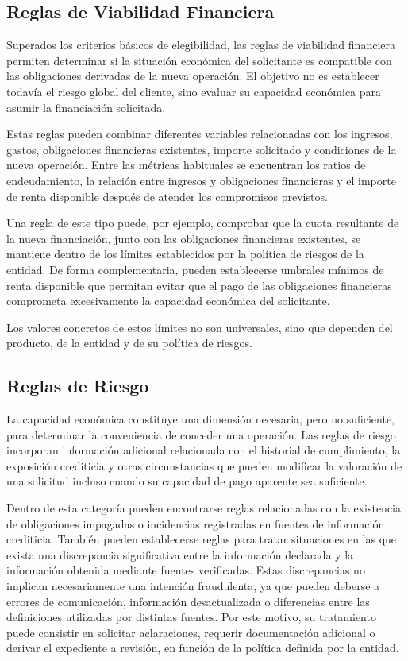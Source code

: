 \documentclass[12pt,a4paper]{report}
\begin{document}
\subsection{Reglas de Viabilidad Financiera}

Superados los criterios básicos de elegibilidad, las reglas de viabilidad financiera permiten determinar si la situación económica del solicitante es compatible con las obligaciones derivadas de la nueva operación. El objetivo no es establecer todavía el riesgo global del cliente, sino evaluar su capacidad económica para asumir la financiación solicitada.

Estas reglas pueden combinar diferentes variables relacionadas con los ingresos, gastos, obligaciones financieras existentes, importe solicitado y condiciones de la nueva operación. Entre las métricas habituales se encuentran los ratios de endeudamiento, la relación entre ingresos y obligaciones financieras y el importe de renta disponible después de atender los compromisos previstos.

Una regla de este tipo puede, por ejemplo, comprobar que la cuota resultante de la nueva financiación, junto con las obligaciones financieras existentes, se mantiene dentro de los límites establecidos por la política de riesgos de la entidad. De forma complementaria, pueden establecerse umbrales mínimos de renta disponible que permitan evitar que el pago de las obligaciones financieras comprometa excesivamente la capacidad económica del solicitante.

Los valores concretos de estos límites no son universales, sino que dependen del producto, de la entidad y de su política de riesgos.

\subsection{Reglas de Riesgo}

La capacidad económica constituye una dimensión necesaria, pero no suficiente, para determinar la conveniencia de conceder una operación. Las reglas de riesgo incorporan información adicional relacionada con el historial de cumplimiento, la exposición crediticia y otras circunstancias que pueden modificar la valoración de una solicitud incluso cuando su capacidad de pago aparente sea suficiente.

Dentro de esta categoría pueden encontrarse reglas relacionadas con la existencia de obligaciones impagadas o incidencias registradas en fuentes de información crediticia. También pueden establecerse reglas para tratar situaciones en las que exista una discrepancia significativa entre la información declarada y la información obtenida mediante fuentes verificadas. Estas discrepancias no implican necesariamente una intención fraudulenta, ya que pueden deberse a errores de comunicación, información desactualizada o diferencias entre las definiciones utilizadas por distintas fuentes. Por este motivo, su tratamiento puede consistir en solicitar aclaraciones, requerir documentación adicional o derivar el expediente a revisión, en función de la política definida por la entidad.
\end{document}
